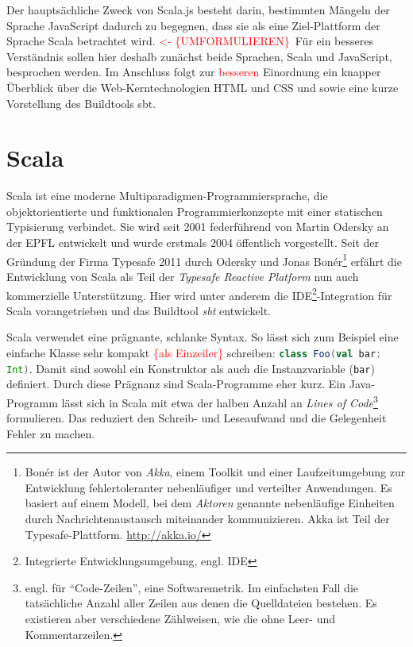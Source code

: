 \documentclass[a4paper, 12pt, hidelinks, listof=totoc, listoftables=totoc, bibliography=totoc]{scrreprt}
\newcommand{\scala}[1]{\lstinline[language=Scala, style=inline]|#1|}
\newcommand{\TODO}[1]{\textcolor{red}{#1}\newline}
\newcommand{\TODOi}[1]{\textcolor{red}{\{#1\}}}
\newcommand{\REDOi}{\textcolor{red}{<- \{UMFORMULIEREN\}~}}
\begin{document}
Der hauptsächliche Zweck von Scala.js besteht darin, bestimmten Mängeln der Sprache JavaScript dadurch zu begegnen, dass sie als eine Ziel-Plattform der Sprache Scala betrachtet wird. \REDOi Für ein besseres Verständnis sollen hier deshalb zunächst beide Sprachen, Scala und JavaScript, besprochen werden. Im Anschluss folgt zur \TODO{besseren} Einordnung ein knapper Überblick über die Web-Kerntechnologien \ac{HTML} und CSS und sowie eine kurze Vorstellung des Buildtools sbt.

\section{Scala}



Scala ist eine moderne Multiparadigmen-Programmiersprache, die objektorientierte und funktionalen Programmierkonzepte mit einer statischen Typisierung verbindet. Sie wird seit 2001 federführend von Martin Odersky an der \ac{EPFL} entwickelt und wurde erstmals 2004 öffentlich vorgestellt.
Seit der Gründung der Firma Typesafe 2011 durch Odersky und Jonas Bonér\footnote{Bonér ist der Autor von \emph{Akka}, einem Toolkit und einer Laufzeitumgebung zur Entwicklung fehlertoleranter nebenläufiger und verteilter Anwendungen. Es basiert auf einem Modell, bei dem \emph{Aktoren} genannte nebenläufige Einheiten durch Nachrichtenaustausch miteinander kommunizieren. Akka ist Teil der Typesafe-Plattform. \url{http://akka.io/}} erfährt die Entwicklung von Scala als Teil der \emph{Typesafe Reactive Platform} nun auch kommerzielle Unterstützung.
Hier wird unter anderem die IDE\footnote{Integrierte Entwicklungsumgebung, engl. \ac{IDE}}-Integration für Scala vorangetrieben und das Buildtool \emph{sbt} entwickelt.\cite{scala-lang2011.CSS} 

Scala verwendet eine prägnante, schlanke Syntax. So lässt sich zum Beispiel eine einfache Klasse sehr kompakt \TODOi{als Einzeiler} schreiben: \scala{class Foo(val bar: Int)}. Damit sind sowohl ein Konstruktor als auch die Instanzvariable (\scala{bar}) definiert. Durch diese Prägnanz sind Scala-Programme eher kurz. Ein Java-Programm lässt sich in Scala mit etwa der halben Anzahl an \emph{Lines of Code}\footnote{engl. für "`Code-Zeilen"', eine Softwaremetrik. Im einfachsten Fall die tatsächliche Anzahl aller Zeilen aus denen die Quelldateien bestehen. Es existieren aber verschiedene Zählweisen, wie die ohne Leer- und Kommentarzeilen.} formulieren. Das reduziert den Schreib- und Leseaufwand und die Gelegenheit Fehler zu machen.
\end{document}
